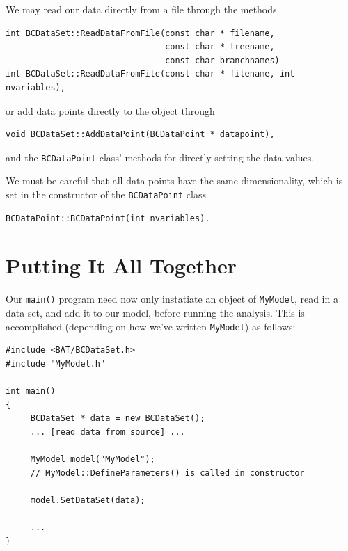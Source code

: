 \documentclass[a4paper,11pt]{article}
\newcommand{\Icode}[1]{\texttt{#1}}
\begin{document}
We may read our data directly from a file through the methods
\begin{verbatim}
int BCDataSet::ReadDataFromFile(const char * filename,
                                const char * treename,
                                const char branchnames)
int BCDataSet::ReadDataFromFile(const char * filename, int nvariables),
\end{verbatim}
or add data points directly to the object through
\begin{verbatim}
void BCDataSet::AddDataPoint(BCDataPoint * datapoint),
\end{verbatim}
and the \Icode{BCDataPoint} class' methods for directly setting the
data values.

We must be careful that all data points have the same dimensionality,
which is set in the constructor of the \Icode{BCDataPoint} class
\begin{verbatim}
BCDataPoint::BCDataPoint(int nvariables).
\end{verbatim}



\section{Putting It All Together}

Our \Icode{main()} program need now only instatiate an object of
\Icode{MyModel}, read in a data set, and add it to our model, before
running the analysis.  This is accomplished (depending on how we've
written \Icode{MyModel}) as follows:
\begin{verbatim}
#include <BAT/BCDataSet.h>
#include "MyModel.h"

int main()
{
     BCDataSet * data = new BCDataSet();
     ... [read data from source] ...

     MyModel model("MyModel");
     // MyModel::DefineParameters() is called in constructor

     model.SetDataSet(data);

     ...
}
\end{verbatim}
\end{document}
